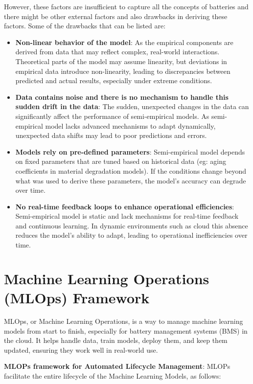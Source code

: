 However, these factors are insufficient to capture all the concepts of batteries and there might be other external factors and also drawbacks in deriving these factors. Some of the drawbacks that can be listed are:
\begin{itemize}
    \item \textbf{Non-linear behavior of the model}: As the empirical components are derived from data that may reflect complex, real-world interactions. Theoretical parts of the model may assume linearity, but deviations in empirical data introduce non-linearity, leading to discrepancies between predicted and actual results, especially under extreme conditions. \cite{pr8111462}
    \item \textbf{Data contains noise and there is no mechanism to handle this sudden drift in the data}: The sudden, unexpected changes in the data can significantly affect the performance of semi-empirical models. As semi-empirical model lacks advanced mechanisms to adapt dynamically, unexpected data shifts may lead to poor predictions and errors. \cite{s21248304}
    \item \textbf{Models rely on pre-defined parameters}:\cite{doi:10.1021/ie990486w} Semi-empirical model depends on fixed parameters that are tuned based on historical data (eg: aging coefficients in material degradation models). If the conditions change beyond what was used to derive these parameters, the model’s accuracy can degrade over time.
    \item \textbf{No real-time feedback loops to enhance operational efficiencies}: Semi-empirical model is static and lack mechanisms for real-time feedback and continuous learning. In dynamic environments such as cloud this absence reduces the model’s ability to adapt, leading to operational inefficiencies over time. \\ \cite{7462263}\cite{8633871}
\end{itemize}
\section{Machine Learning Operations (MLOps) Framework}
MLOps, or Machine Learning Operations, is a way to manage machine learning models from start to finish, especially for battery management systems (BMS) in the cloud. It helps handle data, train models, deploy them, and keep them updated, ensuring they work well in real-world use.

\textbf{MLOPs framework for Automated Lifecycle Management}:
MLOPs facilitate the entire lifecycle of the Machine Learning Models, as follows:

